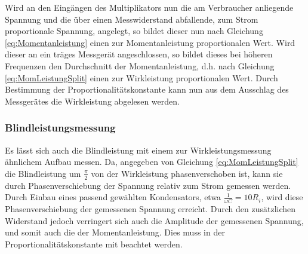 Wird an den Eingängen des Multiplikators nun die am Verbraucher anliegende Spannung und die über einen Messwiderstand abfallende, zum Strom proportionale Spannung, angelegt, so bildet dieser nun nach Gleichung \eqref{eq:Momentanleistung} einen zur Momentanleistung proportionalen Wert. Wird dieser an ein träges Messgerät angeschlossen, so bildet dieses bei höheren Frequenzen den Durchschnitt der Momentanleistung, d.h. nach Gleichung \eqref{eq:MomLeistungSplit} einen zur Wirkleistung proportionalen Wert. Durch Bestimmung der Proportionalitätskonstante kann nun aus dem Ausschlag des Messgerätes die Wirkleistung abgelesen werden.

\subsubsection{Blindleistungsmessung}
Es lässt sich auch die Blindleistung mit einem zur Wirkleistungsmessung ähnlichem Aufbau messen. Da, angegeben von Gleichung \eqref{eq:MomLeistungSplit} die Blindleistung um $\frac{\pi}{2}$ von der Wirkleistung phasenverschoben ist, kann sie durch Phasenverschiebung der Spannung relativ zum Strom gemessen werden.
Durch Einbau eines passend gewählten Kondensators, etwa $\frac{1}{\omega C} = 10R_i$, wird diese Phasenverschiebung der gemessenen Spannung erreicht. Durch den zusätzlichen Widerstand jedoch verringert sich auch die Amplitude der gemessenen Spannung, und somit auch die der Momentanleistung. Dies muss in der Proportionalitätskonstante mit beachtet werden.